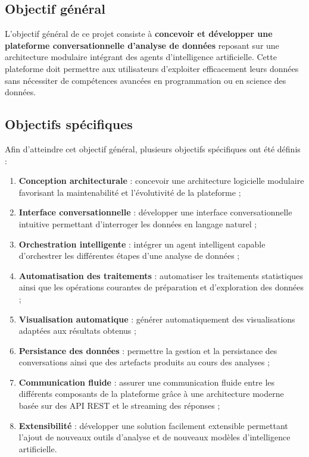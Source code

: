 \subsection{Objectif général}

L'objectif général de ce projet consiste à \textbf{concevoir et développer une plateforme conversationnelle d'analyse de données} reposant sur une architecture modulaire intégrant des agents d'intelligence artificielle. Cette plateforme doit permettre aux utilisateurs d'exploiter efficacement leurs données sans nécessiter de compétences avancées en programmation ou en science des données.

\subsection{Objectifs spécifiques}

Afin d'atteindre cet objectif général, plusieurs objectifs spécifiques ont été définis :

\begin{enumerate}
  \item \textbf{Conception architecturale} : concevoir une architecture logicielle modulaire favorisant la maintenabilité et l'évolutivité de la plateforme ;
  
  \item \textbf{Interface conversationnelle} : développer une interface conversationnelle intuitive permettant d'interroger les données en langage naturel ;
  
  \item \textbf{Orchestration intelligente} : intégrer un agent intelligent capable d'orchestrer les différentes étapes d'une analyse de données ;
  
  \item \textbf{Automatisation des traitements} : automatiser les traitements statistiques ainsi que les opérations courantes de préparation et d'exploration des données ;
  
  \item \textbf{Visualisation automatique} : générer automatiquement des visualisations adaptées aux résultats obtenus ;
  
  \item \textbf{Persistance des données} : permettre la gestion et la persistance des conversations ainsi que des artefacts produits au cours des analyses ;
  
  \item \textbf{Communication fluide} : assurer une communication fluide entre les différents composants de la plateforme grâce à une architecture moderne basée sur des API REST et le streaming des réponses ;
  
  \item \textbf{Extensibilité} : développer une solution facilement extensible permettant l'ajout de nouveaux outils d'analyse et de nouveaux modèles d'intelligence artificielle.
\end{enumerate}

